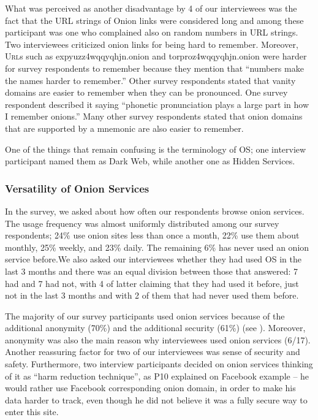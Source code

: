 What was perceived as another disadvantage by 4 of our interviewees was the fact that the URL strings of Onion links were considered long and among these participant was one who complained also on random numbers in URL strings. Two interviewees criticized onion links for being hard to remember. Moreover, \textsc{Url}s such as expyuzz4wqqyqhjn.onion and torproz4wqqyqhjn.onion were
harder for survey respondents to remember because they mention that ``numbers make the
names harder to remember.''  Other survey respondents stated that vanity domains are easier to
remember when they can be pronounced.  One survey respondent described it saying 
``phonetic pronunciation plays a large part in how I remember onions.'' Many
other survey  respondents stated that onion domains that are supported by a mnemonic are
also easier to remember.  
 
 One of the things that remain confusing is the terminology of OS; one interview participant named them as Dark Web, while another one as Hidden Services.  
\subsubsection{ Versatility of Onion Services }
In the survey, we asked about how often our respondents browse onion
services.  The usage frequency was almost uniformly distributed among our survey
respondents; 24\% use onion sites less than once a month, 22\% use them about
monthly, 25\% weekly, and 23\% daily.  The remaining 6\% has never used an onion
service before.We also asked our interviewees whether they had used OS in the last 3 months and there was an equal division between those that answered: 7 had and 7 had not, with 4 of latter claiming that they had used it before, just not in the last 3 months and with 2 of them that had never used them before.

The majority of our survey participants  used onion services
because of the additional anonymity (70\%) and the additional security (61\%) (see ). Moreover,  anonymity was also the main reason why interviewees used onion services (6/17). Another reassuring factor for two of our interviewees was sense of security and safety. Furthermore, two interview participants decided on onion services thinking of it as “harm reduction technique”, as P10 explained on Facebook example – he would rather use Facebook corresponding onion domain, in order to make his data harder to track, even though he did not believe it was a fully secure way to enter this site.

